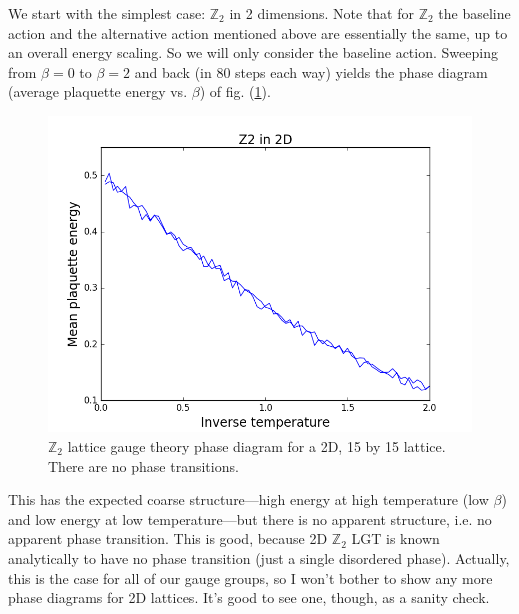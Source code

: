 \documentclass[9pt,twocolumn,twoside]{article}
\begin{document}
We start with the simplest case: $\mathbb{Z}_2$ in 2 dimensions.  Note that for $\mathbb{Z}_2$ the baseline action and the alternative action mentioned above are essentially the same, up to an overall energy scaling.  So we will only consider the baseline action.  Sweeping from $\beta=0$ to $\beta=2$ and back (in 80 steps each way) yields the phase diagram (average plaquette energy vs. $\beta$) of fig. (\ref{z2,2d}).
\begin{figure}[h!]
	\begin{centering}
	\includegraphics[width=\columnwidth]{z2,2d}
	\caption[$\mathbb{Z}_2$ lattice gauge theory phase diagram for a 2D lattice.]{$\mathbb{Z}_2$ lattice gauge theory phase diagram for a 2D, 15 by 15 lattice.  There are no phase transitions.}
	\label{z2,2d}
	\end{centering}
\end{figure}

This has the expected coarse structure---high energy at high temperature (low $\beta$) and low energy at low temperature---but there is no apparent structure, i.e. no apparent phase transition.  This is good, because 2D $\mathbb{Z}_2$ LGT is known analytically to have no phase transition (just a single disordered phase).  Actually, this is the case for all of our gauge groups, so I won't bother to show any more phase diagrams for 2D lattices.  It's good to see one, though, as a sanity check.  
\end{document}
